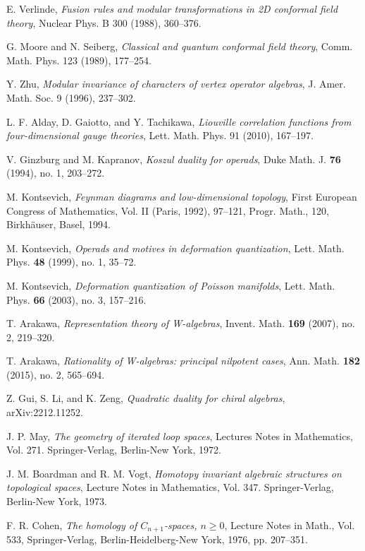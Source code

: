 \begin{thebibliography}{99}
 E. Verlinde, \emph{Fusion rules and modular transformations in 2D conformal field theory}, 
  Nuclear Phys. B 300 (1988), 360--376.

 G. Moore and N. Seiberg, \emph{Classical and quantum conformal field theory}, 
  Comm. Math. Phys. 123 (1989), 177--254.

 Y. Zhu, \emph{Modular invariance of characters of vertex operator algebras}, 
  J. Amer. Math. Soc. 9 (1996), 237--302.

 L. F. Alday, D. Gaiotto, and Y. Tachikawa, \emph{Liouville correlation functions from four-dimensional gauge theories}, 
  Lett. Math. Phys. 91 (2010), 167--197.

 V. Ginzburg and M. Kapranov, \emph{Koszul duality for operads}, Duke Math. J. \textbf{76} (1994), no. 1, 203--272.

 M. Kontsevich, \emph{Feynman diagrams and low-dimensional topology}, First European Congress of Mathematics, Vol. II (Paris, 1992), 97--121, Progr. Math., 120, Birkhäuser, Basel, 1994.

 M. Kontsevich, \emph{Operads and motives in deformation quantization}, Lett. Math. Phys. \textbf{48} (1999), no. 1, 35--72.

 M. Kontsevich, \emph{Deformation quantization of Poisson manifolds}, Lett. Math. Phys. \textbf{66} (2003), no. 3, 157--216.

 T. Arakawa, \emph{Representation theory of W-algebras}, Invent. Math. \textbf{169} (2007), no. 2, 219--320.

 T. Arakawa, \emph{Rationality of W-algebras: principal nilpotent cases}, Ann. Math. \textbf{182} (2015), no. 2, 565--694.

 Z. Gui, S. Li, and K. Zeng, \emph{Quadratic duality for chiral algebras}, arXiv:2212.11252.

 J. P. May, \emph{The geometry of iterated loop spaces}, Lectures Notes in Mathematics, Vol. 271. Springer-Verlag, Berlin-New York, 1972.

 J. M. Boardman and R. M. Vogt, \emph{Homotopy invariant algebraic structures on topological spaces}, Lecture Notes in Mathematics, Vol. 347. Springer-Verlag, Berlin-New York, 1973.

 F. R. Cohen, \emph{The homology of $C_{n+1}$-spaces, $n \geq 0$}, Lecture Notes in Math., Vol. 533, Springer-Verlag, Berlin-Heidelberg-New York, 1976, pp. 207--351.


\end{thebibliography}
